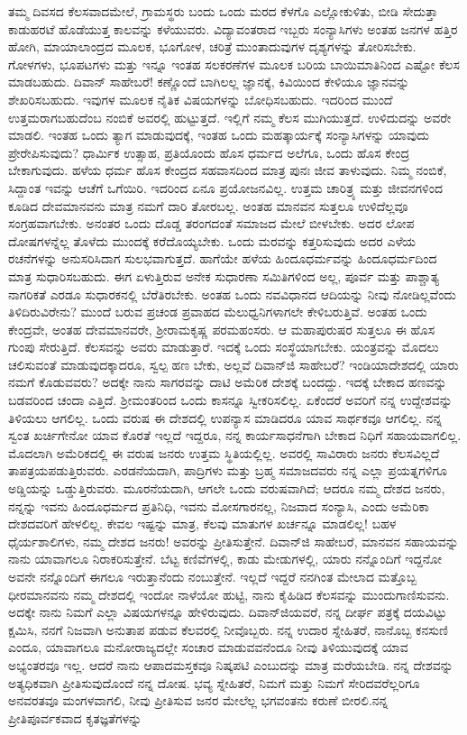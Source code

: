 ತಮ್ಮ ದಿವಸದ ಕೆಲಸವಾದಮೇಲೆ, ಗ್ರಾಮಸ್ಥರು ಬಂದು ಒಂದು ಮರದ ಕೆಳಗೊ ಎಲ್ಲೋಕುಳಿತು, ಬೀಡಿ ಸೇದುತ್ತಾ ಕಾಡುಹರಟೆ ಹೊಡೆಯುತ್ತ ಕಾಲವನ್ನು ಕಳೆಯುವರು. ವಿದ್ಯಾವಂತರಾದ ಇಬ್ಬರು ಸಂನ್ಯಾಸಿಗಳು ಅಂತಹ ಜನಗಳ ಹತ್ತಿರ ಹೋಗಿ, ಮಾಯಾಲಾಂದ್ರದ ಮೂಲಕ, ಭೂಗೋಳ, ಚರಿತ್ರೆ ಮುಂತಾದುವುಗಳ ದೃಶ್ಯಗಳನ್ನು ತೋರಿಸಬೇಕು. ಗೋಳಗಳು, ಭೂಪಟಗಳು ಮತ್ತು ಇನ್ನೂ ಇಂತಹ ಸಲಕರಣೆಗಳ ಮೂಲಕ ಬರಿಯ ಬಾಯಿಮಾತಿನಿಂದ ಎಷ್ಟೋ ಕೆಲಸ ಮಾಡಬಹುದು. ದಿವಾನ್ ಸಾಹೇಬರೆ! ಕಣ್ಣೊಂದೆ ಬಾಗಿಲಲ್ಲ ಜ್ಞಾನಕ್ಕೆ, ಕಿವಿಯಿಂದ ಕೇಳಿಯೂ ಜ್ಞಾನವನ್ನು ಶೇಖರಿಸಬಹುದು. ಇವುಗಳ ಮೂಲಕ ನೈತಿಕ ವಿಷಯಗಳನ್ನು ಬೋಧಿಸಬಹುದು. ಇದರಿಂದ ಮುಂದೆ ಉತ್ತಮರಾಗಬಹುದೆಂಬ ನಂಬಿಕೆ ಅವರಲ್ಲಿ ಹುಟ್ಟುತ್ತದೆ. ಇಲ್ಲಿಗೆ ನಮ್ಮ ಕೆಲಸ ಮುಗಿಯುತ್ತದೆ. ಉಳಿದುದನ್ನು ಅವರೇ ಮಾಡಲಿ. ಇಂತಹ ಒಂದು ತ್ಯಾಗ ಮಾಡುವುದಕ್ಕೆ, ಇಂತಹ ಒಂದು ಮಹತ್ಕಾರ್ಯಕ್ಕೆ ಸಂನ್ಯಾಸಿಗಳನ್ನು ಯಾವುದು ಪ್ರೇರೇಪಿಸುವುದು? ಧಾರ್ಮಿಕ ಉತ್ಸಾಹ, ಪ್ರತಿಯೊಂದು ಹೊಸ ಧರ್ಮದ ಅಲೆಗೂ, ಒಂದು ಹೊಸ ಕೇಂದ್ರ ಬೇಕಾಗುವುದು. ಹಳೆಯ ಧರ್ಮ ಹೊಸ ಕೇಂದ್ರದ ಸಹವಾಸದಿಂದ ಮಾತ್ರ ಪುನಃ ಜೀವ ತಾಳುವುದು. ನಿಮ್ಮ ನಂಬಿಕೆ, ಸಿದ್ದಾಂತ ಇವನ್ನು ಆಚೆಗೆ ಒಗೆಯಿರಿ. ಇದರಿಂದ ಏನೂ ಪ್ರಯೋಜನವಿಲ್ಲ. ಉತ್ತಮ ಚಾರಿತ್ರ್ಯ ಮತ್ತು ಜೀವನಗಳಿಂದ ಕೂಡಿದ ದೇವಮಾನವನು ಮಾತ್ರ ನಮಗೆ ದಾರಿ ತೋರಬಲ್ಲ. ಅಂತಹ ಮಾನವನ ಸುತ್ತಲೂ ಉಳಿದೆಲ್ಲವೂ ಸಂಗ್ರಹವಾಗಬೇಕು. ಅನಂತರ ಒಂದು ದೊಡ್ಡ ತರಂಗದಂತೆ ಸಮಾಜದ ಮೇಲೆ ಬೀಳಬೇಕು. ಅದರ ಲೋಪ ದೋಷಗಳನ್ನೆಲ್ಲ ತೊಳೆದು ಮುಂದಕ್ಕೆ ಕರೆದೊಯ್ಯಬೇಕು. ಒಂದು ಮರವನ್ನು ಕತ್ತರಿಸುವುದು ಅದರ ಎಳೆಯ ರಚನೆಗಳನ್ನು ಅನುಸರಿಸಿದಾಗ ಸುಲಭವಾಗುತ್ತದೆ. ಹಾಗೆಯೇ ಹಳೆಯ ಹಿಂದೂಧರ್ಮವನ್ನು ಹಿಂದೂಧರ್ಮದಿಂದ ಮಾತ್ರ ಸುಧಾರಿಸಬಹುದು. ಈಗ ಏಳುತ್ತಿರುವ ಅನೇಕ ಸುಧಾರಣಾ ಸಮಿತಿಗಳಿಂದ ಅಲ್ಲ, ಪೂರ್ವ ಮತ್ತು ಪಾಶ್ಚಾತ್ಯ ನಾಗರಿಕತೆ ಎರಡೂ ಸುಧಾರಕನಲ್ಲಿ ಬೆರೆತಿರಬೇಕು. ಅಂತಹ ಒಂದು ನವವಿಧಾನದ ಆದಿಯನ್ನು ನೀವು ನೋಡಿಲ್ಲವೆಂದು ತಿಳಿದಿರುವಿರೇನು? ಮುಂದೆ ಬರುವ ಪ್ರಚಂಡ ಪ್ರವಾಹದ ಮೆಲುಧ್ವನಿಗಳಾಗಲೇ ಕೇಳಿಬರುತ್ತಿವೆ. ಅಂತಹ ಒಂದು ಕೇಂದ್ರವೇ, ಅಂತಹ ದೇವಮಾನವರೇ, ಶ‍್ರೀರಾಮಕೃಷ್ಣ ಪರಮಹಂಸರು. ಆ ಮಹಾಪುರುಷರ ಸುತ್ತಲೂ ಈ ಹೊಸ ಗುಂಪು ಸೇರುತ್ತಿದೆ. ಕೆಲಸವನ್ನು ಅವರು ಮಾಡುತ್ತಾರೆ. ಇದಕ್ಕೆ ಒಂದು ಸಂಸ್ಥೆಯಾಗಬೇಕು. ಯಂತ್ರವನ್ನು ಮೊದಲು ಚಲಿಸುವಂತೆ ಮಾಡುವುದಕ್ಕಾದರೂ, ಸ್ವಲ್ಪ ಹಣ ಬೇಕು, ಅಲ್ಲವೆ ದಿವಾನ್‌ಜಿ ಸಾಹೇಬರೆ? ಇಂಡಿಯಾದೇಶದಲ್ಲಿ ಯಾರು ನಮಗೆ ಕೊಡುವವರು? ಅದಕ್ಕೇ ನಾನು ಸಾಗರವನ್ನು ದಾಟಿ ಅಮೆರಿಕ ದೇಶಕ್ಕೆ ಬಂದದ್ದು. ಇದಕ್ಕೆ ಬೇಕಾದ ಹಣವನ್ನು ಬಡವರಿಂದ ಚಂದಾ ಎತ್ತಿದೆ. ಶ‍್ರೀಮಂತರಿಂದ ಒಂದು ಕಾಸನ್ನೂ ಸ್ವೀಕರಿಸಲಿಲ್ಲ. ಏಕೆಂದರೆ ಅವರಿಗೆ ನನ್ನ ಉದ್ದೇಶವನ್ನು ತಿಳಿಯಲು ಆಗಲಿಲ್ಲ. ಒಂದು ವರುಷ ಈ ದೇಶದಲ್ಲಿ ಉಪನ್ಯಾಸ ಮಾಡಿದರೂ ಯಾವ ಸಾರ್ಥಕವೂ ಆಗಲಿಲ್ಲ. ನನ್ನ ಸ್ವಂತ ಖರ್ಚಿಗೇನೋ ಯಾವ ಕೊರತೆ ಇಲ್ಲದೆ ಇದ್ದರೂ, ನನ್ನ ಕಾರ್ಯಸಾಧನೆಗಾಗಿ ಬೇಕಾದ ನಿಧಿಗೆ ಸಹಾಯವಾಗಲಿಲ್ಲ. ಮೊದಲಾಗಿ ಅಮೆರಿಕದಲ್ಲಿ ಈ ವರುಷ ಜನರು ಉತ್ತಮ ಸ್ಥಿತಿಯಲ್ಲಿಲ್ಲ. ಅವರಲ್ಲಿ ಸಾವಿರಾರು ಜನರು ಕೆಲಸವಿಲ್ಲದೆ ತಾಪತ್ರಯಪಡುತ್ತಿರುವರು. ಎರಡನೆಯದಾಗಿ, ಪಾದ್ರಿಗಳು ಮತ್ತು ಬ್ರಹ್ಮ ಸಮಾಜದವರು ನನ್ನ ಎಲ್ಲಾ ಪ್ರಯತ್ನಗಳಿಗೂ ಅಡ್ಡಿಯನ್ನು ಒಡ್ಡುತ್ತಿರುವರು. ಮೂರನೆಯದಾಗಿ, ಆಗಲೇ ಒಂದು ವರುಷವಾಗಿದೆ; ಆದರೂ ನಮ್ಮ ದೇಶದ ಜನರು, ನನ್ನನ್ನು ಇವನು ಹಿಂದೂಧರ್ಮದ ಪ್ರತಿನಿಧಿ, ಇವನು ಮೋಸಗಾರನಲ್ಲ, ನಿಜವಾದ ಸಂನ್ಯಾಸಿ, ಎಂದು ಅಮೆರಿಕಾ ದೇಶದವರಿಗೆ ಹೇಳಲಿಲ್ಲ. ಕೇವಲ ಇಷ್ಟನ್ನು ಮಾತ್ರ, ಕೆಲವು ಮಾತುಗಳ ಖರ್ಚನ್ನೂ ಮಾಡಲಿಲ್ಲ! ಬಹಳ ಧೈರ್ಯಶಾಲಿಗಳು, ನಮ್ಮ ದೇಶದ ಜನರು! ಅವರನ್ನು ಪ್ರೀತಿಸುತ್ತೇನೆ. ದಿವಾನ್‌ಜಿ ಸಾಹೇಬರೆ, ಮಾನವನ ಸಹಾಯವನ್ನು ನಾನು ಯಾವಾಗಲೂ ನಿರಾಕರಿಸುತ್ತೇನೆ. ಬೆಟ್ಟ ಕಣಿವೆಗಳಲ್ಲಿ, ಕಾಡು ಮೇಡುಗಳಲ್ಲಿ, ಯಾರು ನನ್ನೊಂದಿಗೆ ಇದ್ದನೋ ಅವನೇ ನನ್ನೊಂದಿಗೆ ಈಗಲೂ ಇರುತ್ತಾನೆಂದು ನಂಬುತ್ತೇನೆ. ಇಲ್ಲದೆ ಇದ್ದರೆ ನನಗಿಂತ ಮೇಲಾದ ಮತ್ತೊಬ್ಬ ಧೀರಮಾನವನು ನಮ್ಮ ದೇಶದಲ್ಲಿ ಇಂದೋ ನಾಳೆಯೋ ಹುಟ್ಟಿ, ನಾನು ಕೈಹಿಡಿದ ಕೆಲಸವನ್ನು ಮುಂದುಗಾಣಿಸುವನು. ಅದಕ್ಕೇ ನಾನು ನಿಮಗೆ ಎಲ್ಲಾ ವಿಷಯಗಳನ್ನೂ ಹೇಳಿರುವುದು. ದಿವಾನ್‌ಜಿಯವರೆ, ನನ್ನ ದೀರ್ಘ ಪತ್ರಕ್ಕೆ ದಯವಿಟ್ಟು ಕ್ಷಮಿಸಿ, ನನಗೆ ನಿಜವಾಗಿ ಅನುತಾಪ ಪಡುವ ಕೆಲವರಲ್ಲಿ ನೀವೊಬ್ಬರು. ನನ್ನ ಉದಾರ ಸ್ನೇಹಿತರೆ, ನಾನೊಬ್ಬ ಕನಸುಣಿ ಎಂದೂ, ಯಾವಾಗಲೂ ಮನೋರಾಜ್ಯದಲ್ಲೇ ಸಂಚಾರ ಮಾಡುವವನೆಂದೂ ನೀವು ತಿಳಿಯುವುದಕ್ಕೆ ಯಾವ ಅಭ್ಯಂತರವೂ ಇಲ್ಲ. ಆದರೆ ನಾನು ಆಪಾದಮಸ್ತಕವೂ ನಿಷ್ಕಪಟಿ ಎಂಬುದನ್ನು ಮಾತ್ರ ಮರೆಯಬೇಡಿ. ನನ್ನ ದೇಶವನ್ನು ಅತ್ಯಧಿಕವಾಗಿ ಪ್ರೀತಿಸುವುದೊಂದೆ ನನ್ನ ದೋಷ. ಭವ್ಯ ಸ್ನೇಹಿತರೆ, ನಿಮಗೆ ಮತ್ತು ನಿಮಗೆ ಸೇರಿದವರೆಲ್ಲರಿಗೂ ಅನವರತವೂ ಮಂಗಳವಾಗಲಿ, ನೀವು ಪ್ರೀತಿಸುವ ಜನರ ಮೇಲೆಲ್ಲ ಭಗವಂತನು ಕರುಣೆ ಬೀರಲಿ.ನನ್ನ ಪ್ರೀತಿಪೂರ್ವಕವಾದ ಕೃತಜ್ಞತೆಗಳನ್ನು 